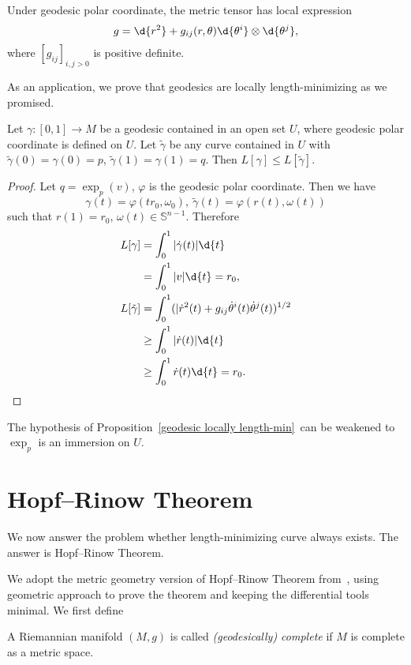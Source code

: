 \begin{cor}
    Under geodesic polar coordinate, the metric tensor has local expression
    \[g=\d{r^2}+g_{ij}(r,\theta)\d{\theta^i}\otimes\d{\theta^j},\]
    where $[g_{ij}]_{i,j>0}$ is positive definite.
\end{cor}

As an application, we prove that geodesics are locally length-minimizing as we promised.

\begin{prop}\label{geodesic locally length-min}
    Let $\gamma:[0,1]\to M$ be a geodesic contained in an open set $U$, where geodesic polar coordinate is defined on $U$.
    Let $\tilde\gamma$ be any curve contained in $U$ with $\tilde\gamma(0)=\gamma(0)=p$, $\tilde\gamma(1)=\gamma(1)=q$.
    Then $L[\gamma]\leq L[\tilde\gamma]$.
\end{prop}
\begin{proof}
    Let $q=\exp_p(v)$, $\varphi$ is the geodesic polar coordinate.
    Then we have
    \[\gamma(t)=\varphi(tr_0,\omega_0),\ \tilde\gamma(t)=\varphi(r(t),\omega(t))\]
    such that $r(1)=r_0$, $\omega(t)\in\mathbb{S}^{n-1}$.
    Therefore
    \begin{align*}
        L[\gamma]&=\int_0^1|\dot\gamma(t)|\d{t}\\
        &=\int_0^1|v|\d{t}=r_0,\\
        L[\tilde\gamma]&=\int_0^1(|\dot{r}^2(t)+g_{ij}\dot\theta^i(t)\dot\theta^j(t))^{1/2}\\
        &\geq\int_0^1|\dot{r}(t)|\d{t}\\
        &\geq\int_0^1\dot{r}(t)\d{t}=r_0.\qedhere
    \end{align*}
\end{proof}

\begin{rem}
    The hypothesis of Proposition~\ref{geodesic locally length-min}~can be weakened to $\exp_p$ is an immersion on $U$.
\end{rem}

\section{Hopf--Rinow Theorem}

We now answer the problem whether length-minimizing curve always exists.
The answer is Hopf--Rinow Theorem.

We adopt the metric geometry version of Hopf--Rinow Theorem from~\cite{Burago}, using geometric approach to prove the theorem and keeping the differential tools minimal.
We first define
\begin{defn}
    A Riemannian manifold $(M,g)$ is called \emph{(geodesically) complete} if $M$ is complete as a metric space.
\end{defn}

